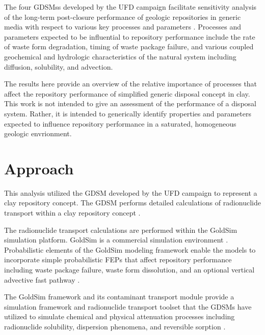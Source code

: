 
The four \glspl{GDSM}s developed by the \gls{UFD} campaign facilitate sensitivity 
analysis of the long-term post-closure performance of geologic repositories in 
generic media with respect to various key processes and parameters 
\cite{clayton_generic_2011}. Processes and parameters expected to be influential to repository 
performance  include the rate of waste form degradation, timing of waste package 
failure, and various coupled geochemical and hydrologic characteristics of the 
natural system including diffusion, solubility, and advection.

The results here provide an overview of the relative importance of processes 
that affect the repository performance of simplified generic disposal 
concept in clay. This work is not intended to give an assessment of the performance of a 
disposal system. Rather, it is intended to  
generically identify properties and parameters expected to influence repository 
performance in a saturated, homogeneous geologic envrionment.


\section{Approach}

This analysis utilized the \gls{GDSM} developed by the \gls{UFD} campaign to 
represent a clay repository concept. The \gls{GDSM} performs detailed 
calculations of radionuclide transport within a clay repository concept \cite{clayton_generic_2011}.  

The radionuclide transport calculations
are performed within the GoldSim simulation platform. GoldSim is a commercial 
simulation environment 
\cite{golder_associates_goldsim_2010, golder_associates_goldsim_2010-1}. 
Probabilistic elements of the GoldSim modeling framework enable the models to 
incorporate simple probabilistic \gls{FEPs} that affect repository performance 
including waste package failure, waste form dissolution, and an optional 
vertical advective fast pathway \cite{clayton_generic_2011}. 

The GoldSim framework and 
its contaminant transport module provide a simulation framework and 
radionuclide transport toolset that the \glspl{GDSM} have utilized to 
simulate chemical and physical attenuation processes including radionuclide 
solubility, dispersion phenomena, and reversible sorption 
\cite{golder_associates_goldsim_2010, golder_associates_goldsim_2010-1}. 


